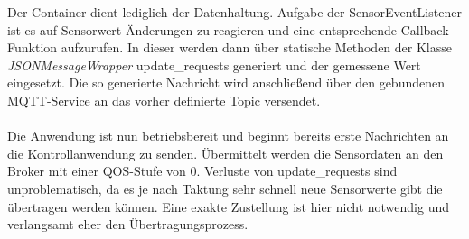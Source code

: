 \documentclass[11pt,a4paper]{report}
\begin{document}
Der Container dient lediglich der Datenhaltung.
Aufgabe der SensorEventListener ist es auf Sensorwert-Änderungen zu reagieren und eine entsprechende Callback-Funktion aufzurufen.
In dieser werden dann über statische Methoden der Klasse \textit{JSONMessageWrapper} update\_requests generiert und der gemessene Wert eingesetzt.
Die so generierte Nachricht wird anschließend über den gebundenen MQTT-Service an das vorher definierte Topic versendet.
\\\\
Die Anwendung ist nun betriebsbereit und beginnt bereits erste Nachrichten an die Kontrollanwendung zu senden.
Übermittelt werden die Sensordaten an den Broker mit einer QOS-Stufe von 0.
Verluste von update\_requests sind unproblematisch, da es je nach Taktung sehr schnell neue Sensorwerte gibt die übertragen werden können.
Eine exakte Zustellung ist hier nicht notwendig und verlangsamt eher den Übertragungsprozess.
\end{document}
